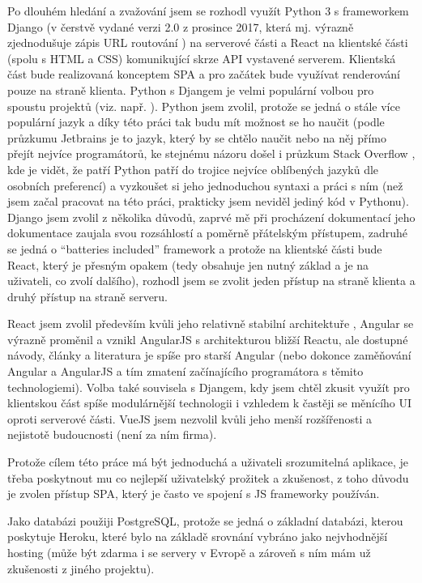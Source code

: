     Po dlouhém hledání a zvažování jsem se rozhodl využít Python 3 s frameworkem Django (v čerstvě vydané verzi 2.0 z prosince 2017, která mj. výrazně zjednodušuje zápis URL routování \cite{django2}) na serverové části a React na klientské části (spolu s HTML a CSS) komunikující skrze API vystavené serverem. Klientská část bude realizovaná konceptem SPA a pro začátek bude využívat renderování pouze na straně klienta. Python s Djangem je velmi populární volbou pro spoustu projektů (viz. např. \cite{stack-stats18}). Python jsem zvolil, protože se jedná o stále více populární jazyk a díky této práci tak budu mít možnost se ho naučit (podle průzkumu Jetbrains \cite{jetbrains-stats} je to jazyk, který by se chtělo naučit nebo na něj přímo přejít nejvíce programátorů, ke stejnému názoru došel i průzkum Stack Overflow \cite{stack-stats18}, kde je vidět, že patří Python patří do trojice nejvíce oblíbených jazyků dle osobních preferencí) a vyzkoušet si jeho jednoduchou syntaxi a práci s ním (než jsem začal pracovat na této práci, prakticky jsem neviděl jediný kód v Pythonu). Django jsem zvolil z několika důvodů, zaprvé mě při procházení dokumentací jeho dokumentace zaujala svou rozsáhlostí a poměrně přátelským přístupem, zadruhé se jedná o \enquote{batteries included} framework a protože na klientské části bude React, který je přesným opakem (tedy obsahuje jen nutný základ a je na uživateli, co zvolí dalšího), rozhodl jsem se zvolit jeden přístup na straně klienta a druhý přístup na straně serveru.
    
    React jsem zvolil především kvůli jeho relativně stabilní architektuře \cite{js-fw2}, Angular se výrazně proměnil a vznikl AngularJS s architekturou bližší Reactu, ale dostupné návody, články a literatura je spíše pro starší Angular (nebo dokonce zaměňování Angular a AngularJS a tím zmatení začínajícího programátora s těmito technologiemi). Volba také souvisela s Djangem, kdy jsem chtěl zkusit využít pro klientskou část spíše modulárnější technologii i vzhledem k častěji se měnícího UI oproti serverové části. VueJS jsem nezvolil kvůli jeho menší rozšířenosti a nejistotě budoucnosti (není za ním firma).
    
    Protože cílem této práce má být jednoduchá a uživateli srozumitelná aplikace, je třeba poskytnout mu co nejlepší uživatelský prožitek a zkušenost, z toho důvodu je zvolen přístup SPA, který je často ve spojení s JS frameworky používán.
    
    Jako databázi použiji PostgreSQL, protože se jedná o základní databázi, kterou poskytuje Heroku, které bylo na základě srovnání vybráno jako nejvhodnější hosting (může být zdarma i se servery v Evropě a zároveň s ním mám už zkušenosti z jiného projektu).